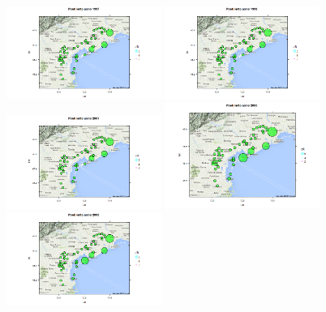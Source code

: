 \documentclass[a4paper,11pt,twoside,openright]{book}							%
\begin{document}
\begin{figure}[H]
\centering
\includegraphics[trim=0cm 0cm 0cm 0cm,clip=true,width=0.45\textwidth]{Immagini/venezia_dati/PL1997.png}
\includegraphics[trim=0cm 0cm 0cm 0cm,clip=true,width=0.45\textwidth]{Immagini/venezia_dati/PL1999.png}
\includegraphics[trim=0cm 0cm 0cm 0cm,clip=true,width=0.45\textwidth]{Immagini/venezia_dati/PL2001.png}
\includegraphics[trim=0cm 0cm 0cm 0cm,clip=true,width=0.45\textwidth]{Immagini/venezia_dati/PL2003.png}
\includegraphics[trim=0cm 0cm 0cm 0cm,clip=true,width=0.45\textwidth]{Immagini/venezia_dati/PL2005.png}

\end{figure}
\end{document}
